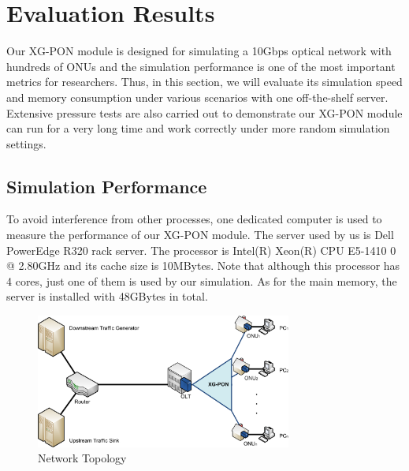 \section{Evaluation Results} \label{section_results}

Our XG-PON module is designed for simulating a 10Gbps optical
network with hundreds of ONUs and the simulation performance is
one of the most important metrics for researchers. Thus, in this
section, we will evaluate its simulation speed and memory
consumption under various scenarios with one off-the-shelf server.
Extensive pressure tests are also carried out to demonstrate our
XG-PON module can run for a very long time and work correctly
under more random simulation settings.

\subsection{Simulation Performance}

To avoid interference from other processes, one dedicated computer
is used to measure the performance of our XG-PON module. The
server used by us is Dell PowerEdge R320 rack server. The
processor is Intel(R) Xeon(R) CPU E5-1410 0 @ 2.80GHz and its
cache size is 10MBytes. Note that although this processor has 4
cores, just one of them is used by our simulation. As for the main
memory, the server is installed with 48GBytes in total.

\begin{figure}[!htbp]
\begin{center}
\includegraphics[width=0.75\textwidth]{images/topology}
\end{center}
\vspace{-0.1in}
\caption{Network Topology}
\label{fig_topology}
\end{figure}

